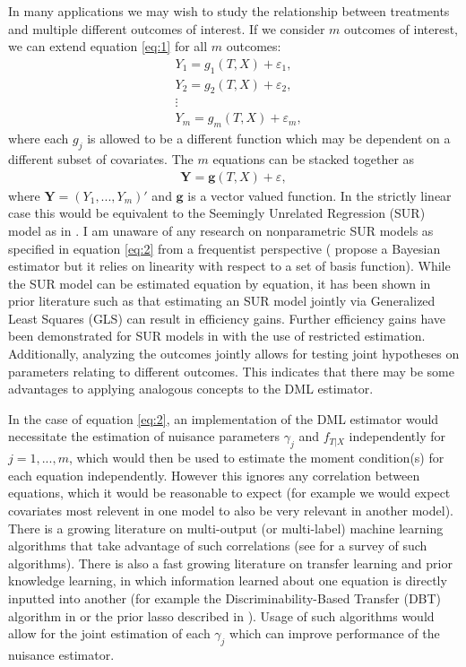 \documentclass[12pt]{article}
\begin{document}
In many applications we may wish to study the relationship between treatments and multiple different outcomes of interest. If we consider $m$ outcomes of interest, we can extend equation \ref{eq:1} for all $m$ outcomes:
\begin{align*}
& Y_1 = g_1(T,X) +\varepsilon_1,\\
& Y_2 =  g_2(T,X) +\varepsilon_2,\\
&\vdots\\
&Y_m =  g_m(T,X) +\varepsilon_m,
\end{align*}
where each $g_j$ is allowed to be a different function which may be dependent on a different subset of covariates. The $m$ equations can be stacked together as
\begin{align}
\mathbf{Y} = \mathbf{g}(T,X) +\varepsilon\label{eq:2},
\end{align}  
where $\mathbf{Y} = (Y_1,...,Y_m)'$ and $\mathbf{g}$ is a vector valued function.  In the strictly linear case this would be equivalent to the Seemingly Unrelated Regression (SUR) model as in \cite{zellner}. I am unaware of any research on nonparametric SUR models as specified in equation \ref{eq:2} from a frequentist perspective (\cite{smith2000nonparametric} propose a Bayesian estimator but it relies on linearity with respect to a set of basis function). While the SUR model can be estimated equation by equation, it has been shown in prior literature such as \cite{zellner1963estimators} that estimating an SUR model jointly via Generalized Least Squares (GLS) can result in efficiency gains. Further efficiency gains have been demonstrated for SUR models in \cite{mehrabani2020improved} with the use of restricted estimation. Additionally, analyzing the outcomes jointly allows for testing joint hypotheses on parameters relating to different outcomes. This indicates that there may be some advantages to applying analogous concepts to the DML estimator. 

In the case of equation \ref{eq:2}, an implementation of the DML estimator would necessitate the estimation of nuisance parameters $\gamma_j$ and $f_{T|X}$ independently for $j=1,...,m$, which would then be used to estimate the moment condition(s) for each equation independently. However this ignores any correlation between equations, which it would be reasonable to expect (for example we would expect covariates most relevent in one model to also be very relevant in another model). There is a growing literature on multi-output (or multi-label) machine learning algorithms that take advantage of such correlations (see \cite{borchani2015survey} for a survey of such algorithms). There is also a fast growing literature on transfer learning and prior knowledge learning, in which information learned about one equation is directly inputted into another (for example the Discriminability-Based Transfer (DBT) algorithm in \cite{pratt1993discriminability} or the prior lasso described in \cite{jiang2016variable}). Usage of such algorithms would allow for the joint estimation of each $\gamma_j$ which can improve performance of the nuisance estimator. 
\end{document}
